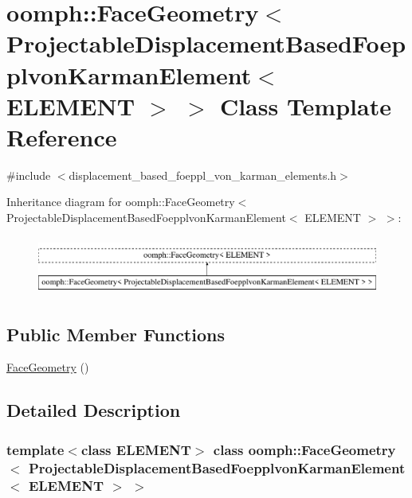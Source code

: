 \hypertarget{classoomph_1_1FaceGeometry_3_01ProjectableDisplacementBasedFoepplvonKarmanElement_3_01ELEMENT_01_4_01_4}{}\section{oomph\+:\+:Face\+Geometry$<$ Projectable\+Displacement\+Based\+Foepplvon\+Karman\+Element$<$ E\+L\+E\+M\+E\+NT $>$ $>$ Class Template Reference}
\label{classoomph_1_1FaceGeometry_3_01ProjectableDisplacementBasedFoepplvonKarmanElement_3_01ELEMENT_01_4_01_4}


{\ttfamily \#include $<$displacement\+\_\+based\+\_\+foeppl\+\_\+von\+\_\+karman\+\_\+elements.\+h$>$}

Inheritance diagram for oomph\+:\+:Face\+Geometry$<$ Projectable\+Displacement\+Based\+Foepplvon\+Karman\+Element$<$ E\+L\+E\+M\+E\+NT $>$ $>$\+:\begin{figure}[H]
\begin{center}
\leavevmode
\includegraphics[height=1.954625cm]{classoomph_1_1FaceGeometry_3_01ProjectableDisplacementBasedFoepplvonKarmanElement_3_01ELEMENT_01_4_01_4}
\end{center}
\end{figure}
\subsection*{Public Member Functions}
\begin{DoxyCompactItemize}
\item 
\hyperlink{classoomph_1_1FaceGeometry_3_01ProjectableDisplacementBasedFoepplvonKarmanElement_3_01ELEMENT_01_4_01_4_a6e379585ea779f4c6d0c8ce2590764bd}{Face\+Geometry} ()
\end{DoxyCompactItemize}


\subsection{Detailed Description}
\subsubsection*{template$<$class E\+L\+E\+M\+E\+NT$>$\newline
class oomph\+::\+Face\+Geometry$<$ Projectable\+Displacement\+Based\+Foepplvon\+Karman\+Element$<$ E\+L\+E\+M\+E\+N\+T $>$ $>$}

